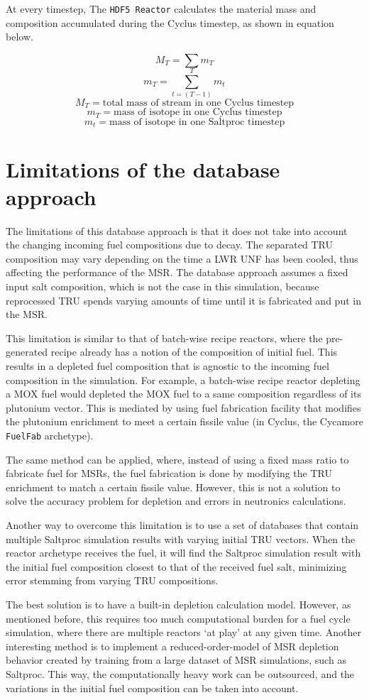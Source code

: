 At every timestep, 
The \texttt{HDF5 Reactor} calculates the material mass
and composition accumulated during the Cyclus timestep,
as shown in equation below.

\[
M_{T} = \sum m_T
\]
\[
m_{T} = \sum_{t=(T-1)}^{T} m_{t}
\]
\[
M_T = \text{total mass of stream in one Cyclus timestep}
\]
\[
m_T = \text{mass of isotope in one Cyclus timestep}
\]
\[
m_t = \text{mass of isotope in one Saltproc timestep}
\]


\section{Limitations of the database approach}
\label{sec:limit}
The limitations of this database approach is that it does not
take into account the changing incoming fuel compositions due to decay.
The separated \gls{TRU} composition may vary depending on the time
a \gls{LWR} \gls{UNF} has been cooled, thus affecting the performance
of the \gls{MSR}. The database approach assumes a fixed input salt
composition, which is not the case in this simulation, because reprocessed
\gls{TRU} spends varying amounts of time until it is fabricated and
put in the \gls{MSR}.

This limitation is similar to that of batch-wise recipe reactors, where the 
pre-generated recipe already has a notion of the composition of initial fuel.
This results in a depleted fuel composition that is agnostic to the incoming
fuel composition in the simulation. For example, a batch-wise recipe reactor
depleting a \gls{MOX} fuel would depleted the \gls{MOX} fuel to a same
composition regardless of its plutonium vector. This is mediated by using
fuel fabrication facility that modifies the plutonium enrichment to
meet a certain fissile value (in Cyclus, the Cycamore \texttt{FuelFab} archetype).

The same method can be applied, where, instead of using a fixed mass ratio
to fabricate fuel for \glspl{MSR}, the fuel fabrication is done by modifying
the \gls{TRU} enrichment to match a certain fissile value. However, this is
not a solution to solve the accuracy problem for depletion and errors
in neutronics calculations.

Another way to overcome this limitation is to use a set of databases 
that contain multiple Saltproc simulation results with varying initial \gls{TRU}
vectors. When the reactor archetype receives the fuel, it will find the
Saltproc simulation result with the initial fuel composition closest to that
of the received fuel salt, minimizing error stemming from varying
\gls{TRU} compositions.

The best solution is to have a built-in depletion calculation model. However,
as mentioned before, this requires too much computational burden for a fuel cycle simulation,
where there are multiple reactors `at play' at any given time. Another
interesting method is to implement a reduced-order-model of \gls{MSR} depletion
behavior created by training from a large dataset of \gls{MSR} simulations, such
as Saltproc. This
way, the computationally heavy work can be outsourced, and the variations
in the initial fuel composition can be taken into account.